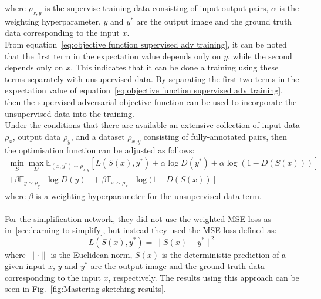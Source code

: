 where $\rho_{x,y}$ is the supervise training data consisting of input-output pairs, $\alpha$ is the weighting hyperparameter, $y$ and $y^*$ are the output image and the ground truth data corresponding to the input $x$.\\
From equation~\ref{eq:objective function supervised adv training}, it can be noted that the first term in the expectation value depends only on $y$, while the second depends only on $x$. This indicates that it can be done a training using these terms separately with unsupervised data. By separating the first two terms in the expectation value of equation~\ref{eq:objective function supervised adv training}, then the supervised adversarial objective function can be used to incorporate the unsupervised data into the training.\\
Under the conditions that there are available an extensive collection of input data $\rho_x$, output data $\rho_y$, and a dataset $\rho_{x,y}$ consisting of fully-annotated pairs, then the optimisation function can be adjusted as follows:
\begin{equation}\begin{split}
    \min_S \max_D \mathbb{E}_{(x,y^*)\sim \rho_{x,y}} [ L(S(x), y^*) + \alpha \log D(y^*) + \alpha \log ( 1 - D(S(x)))] \\
    + \beta \mathbb{E}_{y \sim \rho_y} [\log D(y)] + \beta \mathbb{E}_{x \sim \rho_x} [\log ( 1- D(S(x))]
\end{split}
\end{equation}
where $\beta$ is a weighting hyperparameter for the unsupervised data term.\\ \\
For the simplification network, they did not use the weighted MSE loss as in~\ref{sec:learning to simplify}, but instead they used the MSE loss defined as:
\begin{equation}
    L(S(x),y^*)= \| S(x)-y^*\|^2
\end{equation}
where $\| \cdot \|$ is the Euclidean norm, $S(x)$ is the deterministic prediction of a given input $x$, $y$ and $y^*$ are the output image and the ground truth data corresponding to the input $x$, respectively. The results using this approach can be seen in Fig.~\ref{fig:Mastering sketching results}.
